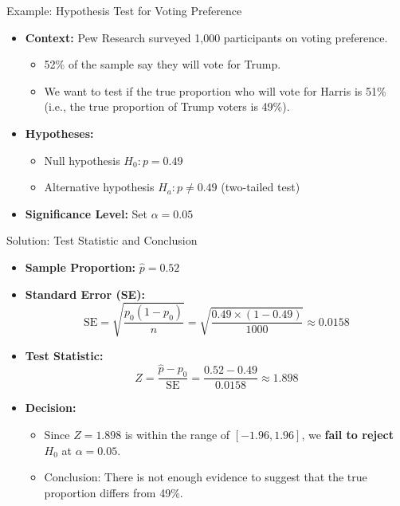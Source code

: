 \documentclass[handout]{beamer} %
\begin{document}
\begin{frame}{Example: Hypothesis Test for Voting Preference}
    \begin{itemize}
        \item \textbf{Context:} Pew Research surveyed 1,000 participants on voting preference.
        \begin{itemize}
            \item 52\% of the sample say they will vote for Trump.
            \item We want to test if the true proportion who will vote for Harris is 51\% (i.e., the true proportion of Trump voters is 49\%).
        \end{itemize}

        \item \textbf{Hypotheses:}
        \begin{itemize}
            \item Null hypothesis \( H_0: p = 0.49 \)
            \item Alternative hypothesis \( H_a: p \neq 0.49 \) (two-tailed test)
        \end{itemize}
        
        \item \textbf{Significance Level:} Set \( \alpha = 0.05 \)
    \end{itemize}
\end{frame}

\begin{frame}{Solution: Test Statistic and Conclusion}
    \begin{itemize}
        \item \textbf{Sample Proportion:} \( \hat{p} = 0.52 \)
        
        \item \textbf{Standard Error (SE):}
\[
        \text{SE} = \sqrt{\frac{p_0(1 - p_0)}{n}} = \sqrt{\frac{0.49 \times (1 - 0.49)}{1000}} \approx 0.0158
\]
        
        \item \textbf{Test Statistic:}
\[
        Z = \frac{\hat{p} - p_0}{\text{SE}} = \frac{0.52 - 0.49}{0.0158} \approx 1.898
\]
        
        \item \textbf{Decision:}
        \begin{itemize}
            \item Since \( Z = 1.898 \) is within the range of \( [-1.96, 1.96] \), we \textbf{fail to reject} \( H_0 \) at \( \alpha = 0.05 \).
            \item Conclusion: There is not enough evidence to suggest that the true proportion differs from 49\%.
        \end{itemize}
    \end{itemize}
\end{frame}
\end{document}
